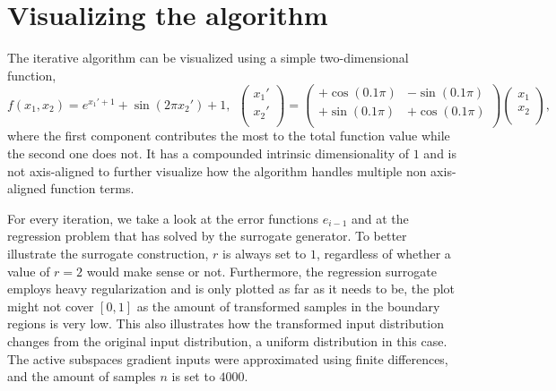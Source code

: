 \documentclass[
  a4paper,  %
  twoside,  %
  bibliography=totoc,
  headsepline,
  cleardoublepage=empty,
  parskip=half,
  draft=false
]{scrbook}
\begin{document}
\newpage
\section{Visualizing the algorithm}

The iterative algorithm can be visualized using a simple two-dimensional function,
\begin{equation}
f(x_1, x_2)=e^{x_1' + 1} + \sin(2 \pi x_2') + 1, ~~ \begin{pmatrix}
    x_1' \\ x_2'
    \\
  \end{pmatrix} = \begin{pmatrix}
    +\cos(0.1 \pi) & -\sin(0.1 \pi)\\
    +\sin(0.1 \pi) & +\cos(0.1 \pi)
    \\
  \end{pmatrix}\begin{pmatrix}
    x_1 \\ x_2
    \\
  \end{pmatrix},
\end{equation}
where the first component contributes the most to the total function value while the second one does not.
It has a compounded intrinsic dimensionality of $1$ and is not axis-aligned to further visualize how the algorithm handles multiple non axis-aligned function terms.

For every iteration, we take a look at the error functions $e_{i - 1}$ and at the regression problem that has solved by the surrogate generator.
To better illustrate the surrogate construction, $r$ is always set to $1$, regardless of whether a value of $r=2$ would make sense or not.
Furthermore, the regression surrogate employs heavy regularization and is only plotted as far as it needs to be, \ie the plot might not cover $[0,1]$ as the amount of transformed samples in the boundary regions is very low.
This also illustrates how the transformed input distribution changes from the original input distribution, a uniform distribution in this case.
The active subspaces gradient inputs were approximated using finite differences, and the amount of samples $n$ is set to $4000$.
\end{document}
